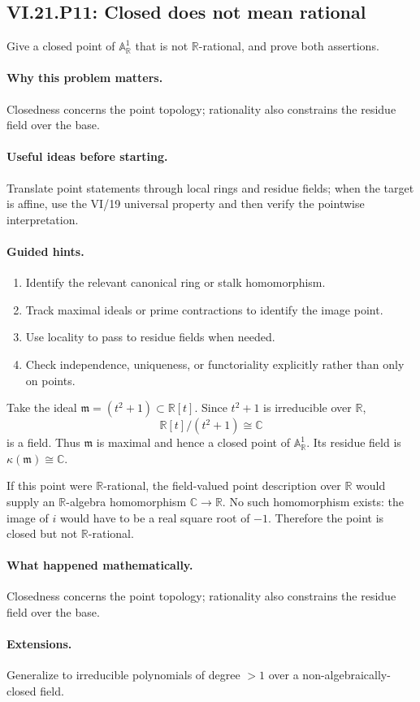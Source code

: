 \subsection*{VI.21.P11: Closed does not mean rational}
\begin{problem}\label{prob:vi21-p11}
Give a closed point of $\mathbb A^1_{\mathbb R}$ that is not $\mathbb R$-rational, and prove both assertions.
\end{problem}

\ifdefined\FullProblemDossiers
\paragraph{Why this problem matters.}
Closedness concerns the point topology; rationality also constrains the residue field over the base.

\paragraph{Useful ideas before starting.}
Translate point statements through local rings and residue fields; when the target is affine, use the VI/19 universal property and then verify the pointwise interpretation.

\paragraph{Guided hints.}
\begin{enumerate}
\item Identify the relevant canonical ring or stalk homomorphism.
\item Track maximal ideals or prime contractions to identify the image point.
\item Use locality to pass to residue fields when needed.
\item Check independence, uniqueness, or functoriality explicitly rather than only on points.
\end{enumerate}

\begin{solution}
Take the ideal $\mathfrak m=(t^2+1)\subset\mathbb R[t]$.  Since $t^2+1$ is irreducible over
$\mathbb R$,
\[
\mathbb R[t]/(t^2+1)\cong\mathbb C
\]
is a field.  Thus $\mathfrak m$ is maximal and hence a closed point of
$\mathbb A^1_{\mathbb R}$.  Its residue field is $\kappa(\mathfrak m)\cong\mathbb C$.

If this point were $\mathbb R$-rational, the field-valued point description over $\mathbb R$ would
supply an $\mathbb R$-algebra homomorphism $\mathbb C\to\mathbb R$.  No such homomorphism exists:
the image of $i$ would have to be a real square root of $-1$.  Therefore the point is closed but not
$\mathbb R$-rational.
\end{solution}

\paragraph{What happened mathematically.}
Closedness concerns the point topology; rationality also constrains the residue field over the base.

\paragraph{Extensions.}
Generalize to irreducible polynomials of degree $>1$ over a non-algebraically-closed field.
\fi
